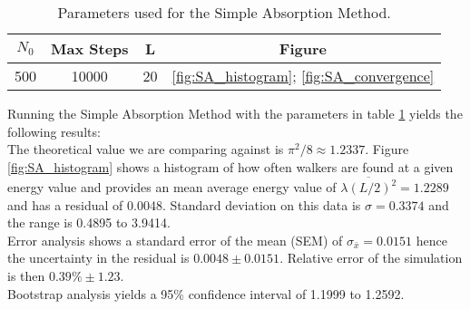 \documentclass[reqno]{amsart}
\numberwithin{equation}{section}
\numberwithin{figure}{section}
\begin{document}
\begin{table}[h]
    \centering
    \begin{tabular}{cccc}
        \hline
        $N_0$ & Max Steps & L & Figure \\
        \hline
        500 & 10000 & 20 & \ref{fig:SA_histogram}; \ref{fig:SA_convergence} \\
        \hline
    \end{tabular}
    \caption{Parameters used for the Simple Absorption Method.}
    \label{tab:SA_params}
\end{table}

Running the Simple Absorption Method with the parameters in table \ref{tab:SA_params} yields the following results: \\

The theoretical value we are comparing against is $\pi^2/8 \approx 1.2337$. Figure \ref{fig:SA_histogram} shows a histogram of how often walkers are found at a given energy value and provides an mean average energy value of $\overline{\lambda (L/2)^2} = 1.2289$ and has a residual of 0.0048. Standard deviation on this data is $\sigma = 0.3374$ and the range is 0.4895 to 3.9414. \\

Error analysis shows a standard error of the mean (SEM) of $\sigma_{\bar{x}} = 0.0151$ hence the uncertainty in the residual is $0.0048 \pm 0.0151$. Relative error of the simulation is then $0.39\% \pm 1.23$. \\

Bootstrap analysis yields a 95\% confidence interval of 1.1999 to 1.2592.


\end{document}
